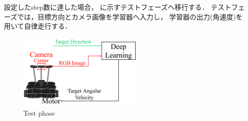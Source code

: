 \documentclass[10pt]{jarticle}
\begin{document}
    設定したstep数に達した場合，
    に示すテストフェーズへ移行する．
    テストフェーズでは，目標方向とカメラ画像を学習器へ入力し，
    学習器の出力(角速度)を用いて自律走行する．
    \begin{center}
        \begin{figure}[h]
            \centering
            \includegraphics[width=6.1cm]{./fig/system_test.pdf}
            \caption{Test phase}
            \label{fig:system_test}
        \end{figure}
    \end{center}
    \vspace{-1zh}
\end{document}
